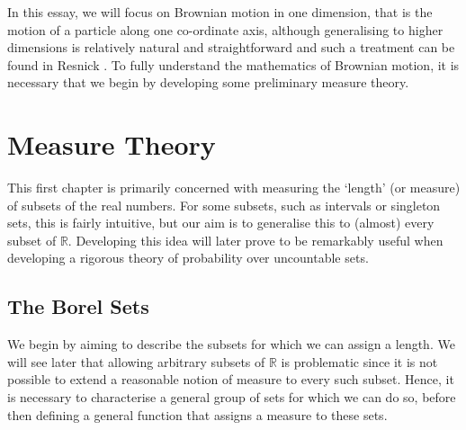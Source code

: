 \documentclass[a4paper,11pt]{article}
\theoremstyle{plain}
\theoremstyle{definition}
\begin{document}
In this essay, we will focus on Brownian motion in one dimension, that is the motion of a particle along one co-ordinate axis, although generalising to higher dimensions is relatively natural and straightforward and such a treatment can be found in Resnick \citep[\S~6]{SIR}. To fully understand the mathematics of Brownian motion, it is necessary that we begin by developing some preliminary measure theory.


\section{Measure Theory}

This first chapter is primarily concerned with measuring the `length' (or measure) of subsets of the real numbers. For some subsets, such as intervals or singleton sets, this is fairly intuitive, but our aim is to generalise this to (almost) every subset of $\mathbb{R}$. Developing this idea will later prove to be remarkably useful when developing a rigorous theory of probability over uncountable sets.

\subsection{The Borel Sets}

We begin by aiming to describe the subsets for which we can assign a length. We will see later that allowing arbitrary subsets of $\mathbb{R}$ is problematic since it is not possible to extend a reasonable notion of measure to every such subset. Hence, it is necessary to characterise a general group of sets for which we can do so, before then defining a general function that assigns a measure to these sets.
\end{document}

